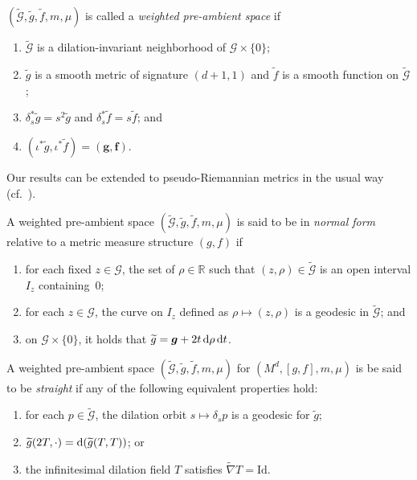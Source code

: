 \documentclass[10pt,a4paper]{amsart}
\newcommand{\cg}{\widetilde{g}}
\newcommand{\cf}{\widetilde{f}}
\newcommand{\cmG}{\widetilde{\mathcal{G}}}
\newcommand{\mG}{\mathcal{G}}
\newcommand{\bR}{\mathbb{R}}
\numberwithin{equation}{section}
\begin{document}
\begin{Definition}
$(\cmG,\cg,\cf,m,\mu)$ is called a \emph{weighted pre-ambient space} if
\begin{enumerate}[label=$(\roman*)$]\itemsep=0pt
 \item $\cmG$ is a dilation-invariant neighborhood of $\mG\times \{0\}$;
 \item $\cg$ is a smooth metric of signature $(d+1,1)$ and $\widetilde{f}$ is a smooth function on $\cmG$;
 \item $\delta_s^*\widetilde{g}=s^2 \widetilde{g}$ and $\delta_s^*\widetilde{f}=s\widetilde{f}$; and
 \item $(\iota^*\widetilde{g},\iota^*\widetilde{f})=(\boldsymbol{g},\boldsymbol{f})$.
\end{enumerate}
\end{Definition}

\begin{Remark}
Our results can be extended to pseudo-Riemannian metrics in the usual way (cf.~\cite{FeffermanGraham2012}).
\end{Remark}

\begin{Definition}
A weighted pre-ambient space $(\cmG,\cg,\cf,m,\mu)$ is said to be in \emph{normal form} relative to a metric measure structure $(g,f)$ if
\begin{enumerate}[label=$(\roman*)$]\itemsep=0pt
 \item for each fixed $z\in\mG$, the set of $\rho\in\bR$ such that $(z,\rho)\in \cmG$ is an open interval $I_z$ containing~$0$;
 \item for each $z\in\mG$, the curve on $I_z$ defined as $\rho\mapsto(z,\rho)$ is a geodesic in $\cmG$; and
 \item on $\mG\times \{0\}$, it holds that $\cg=\boldsymbol{g} + 2t\,{\rm d}\rho\,\mathrm{d}t$.
\end{enumerate}
\end{Definition}

\begin{Definition}
A weighted pre-ambient space $(\cmG,\cg,\cf,m,\mu)$ for $(M^d,[g,f],m,\mu)$ is be said to be \textit{straight} if any of the following equivalent properties hold:
\begin{enumerate}[label=$(\roman*)$]\itemsep=0pt
 \item for each $p\in \widetilde{\mathcal{G}}$, the dilation orbit $s\mapsto \delta_s p$ is a geodesic for $\widetilde{g}$;

 \item $\widetilde{g}(2T,\cdot)={\rm d}(\widetilde{g}(T,T))$; or

\item the infinitesimal dilation field $T$ satisfies $\widetilde{\nabla}T=\mathrm{Id}$.
\end{enumerate}
\end{Definition}
\end{document}
